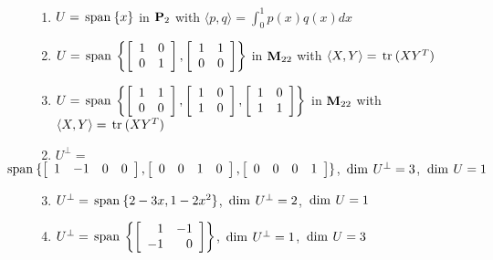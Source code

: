 \begin{multicols}{2}
\begin{ex}
\begin{enumerate}[label={\alph*.}]
\item $ U = \thinspace\operatorname{span\medspace}\{x\} $ in $ \textbf{P}_2 $ with $ \langle p, q \rangle = \int_{0}^{1} p(x)q(x)dx $

\item $ U = \thinspace\operatorname{span\medspace} 
\left\{
\left[ \begin{array}{rr}
1 & 0 \\
0 & 1
\end{array} \right]
,
\left[ \begin{array}{rr}
1 & 1 \\
0 & 0
\end{array} \right]
\right\}$ in $\textbf{M}_{22}$ with $\langle X, Y \rangle = \thinspace\operatorname{tr\medspace}(XY^T)$

\item 
$ U = \thinspace\operatorname{span\medspace} 
\left\{
\left[ \begin{array}{rr}
1 & 1 \\
0 & 0
\end{array} \right]
,
\left[ \begin{array}{rr}
1 & 0 \\
1 & 0
\end{array} \right]
,
\left[ \begin{array}{rr}
1 & 0 \\
1 & 1 
\end{array} \right]
\right\}$ in $\textbf{M}_{22}$ with $\langle X, Y \rangle = \thinspace\operatorname{tr\medspace}(XY^T)$

\end{enumerate}
\begin{sol}
\begin{enumerate}[label={\alph*.}]
\setcounter{enumi}{1}
\item  $U^{\perp} = $ \\ $\hspace*{-4em}\func{span}\{
\leftB \begin{array}{cccc}
1 & -1 & 0 & 0
\end{array} \rightB, 
\leftB \begin{array}{cccc}
0 & 0 & 1 & 0
\end{array} \rightB, 
\leftB \begin{array}{cccc}
0 & 0 & 0 & 1
\end{array} \rightB\}$, $\thinspace\operatorname{dim\medspace} U^{\perp} = 3$, $\thinspace\operatorname{dim\medspace} U = 1$

\setcounter{enumi}{3}
\item  $U^{\perp} = \thinspace\operatorname{span\medspace}\{2 - 3x, 1 - 2x^{2}\}$, $\thinspace\operatorname{dim\medspace} U^{\perp} = 2$, $\thinspace\operatorname{dim\medspace} U = 1$

\setcounter{enumi}{5}
\item $U^\perp = \thinspace\operatorname{span\medspace} \left\{
\left[ \begin{array}{rr}
1 & -1 \\
-1 & 0
\end{array} \right]
\right\}$, $\thinspace\operatorname{dim\medspace} U^\perp = 1$, $\thinspace\operatorname{dim\medspace} U = 3$


\end{enumerate}
\end{sol}
\end{ex}
\end{multicols}

